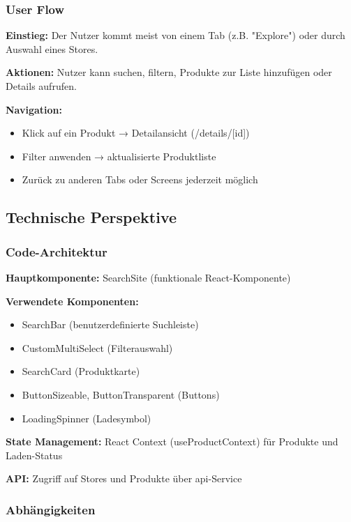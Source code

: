 \documentclass[12pt, a4paper]{report} %
\begin{document}
\subsubsection{User Flow}
\textbf{Einstieg:} Der Nutzer kommt meist von einem Tab (z.B. "Explore") oder durch Auswahl eines Stores.

\noindent\textbf{Aktionen:} Nutzer kann suchen, filtern, Produkte zur Liste hinzufügen oder Details aufrufen.

\noindent\textbf{Navigation:}
\begin{itemize}
    \item Klick auf ein Produkt → Detailansicht (/details/[id])
    \item Filter anwenden → aktualisierte Produktliste
    \item Zurück zu anderen Tabs oder Screens jederzeit möglich
\end{itemize}

\subsection{Technische Perspektive}

\subsubsection{Code-Architektur}

\textbf{Hauptkomponente:} SearchSite (funktionale React-Komponente)

\noindent\textbf{Verwendete Komponenten:}
\begin{itemize}
    \item SearchBar (benutzerdefinierte Suchleiste)
    \item CustomMultiSelect (Filterauswahl)
    \item SearchCard (Produktkarte)
    \item ButtonSizeable, ButtonTransparent (Buttons)
    \item LoadingSpinner (Ladesymbol)
\end{itemize}

\noindent\textbf{State Management:} React Context (useProductContext) für Produkte und Laden-Status

\noindent\textbf{API:} Zugriff auf Stores und Produkte über api-Service

\subsubsection{Abhängigkeiten}
\end{document}
